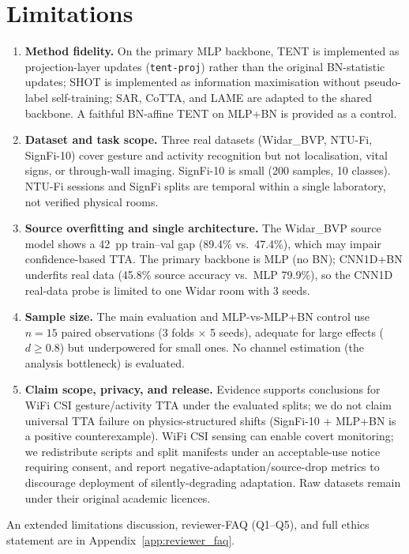 \section{Limitations}

\begin{enumerate}
    \item \textbf{Method fidelity.} On the primary MLP backbone, TENT is implemented as projection-layer updates (\texttt{tent-proj}) rather than the original BN-statistic updates; SHOT is implemented as information maximisation without pseudo-label self-training; SAR, CoTTA, and LAME are adapted to the shared backbone. A faithful BN-affine TENT on MLP+BN is provided as a control.
    \item \textbf{Dataset and task scope.} Three real datasets (Widar\_BVP, NTU-Fi, SignFi-10) cover gesture and activity recognition but not localisation, vital signs, or through-wall imaging. SignFi-10 is small (200 samples, 10 classes). NTU-Fi sessions and SignFi splits are temporal within a single laboratory, not verified physical rooms.
    \item \textbf{Source overfitting and single architecture.} The Widar\_BVP source model shows a 42~pp train--val gap (89.4\% vs.\ 47.4\%), which may impair confidence-based TTA. The primary backbone is MLP (no BN); CNN1D+BN underfits real data (45.8\% source accuracy vs.\ MLP 79.9\%), so the CNN1D real-data probe is limited to one Widar room with 3 seeds.
    \item \textbf{Sample size.} The main evaluation and MLP-vs-MLP+BN control use $n{=}15$ paired observations (3 folds $\times$ 5 seeds), adequate for large effects ($d{\geq}0.8$) but underpowered for small ones. No channel estimation (the analysis bottleneck) is evaluated.
    \item \textbf{Claim scope, privacy, and release.} Evidence supports conclusions for WiFi CSI gesture/activity TTA under the evaluated splits; we do not claim universal TTA failure on physics-structured shifts (SignFi-10 + MLP+BN is a positive counterexample). WiFi CSI sensing can enable covert monitoring; we redistribute scripts and split manifests under an acceptable-use notice requiring consent, and report negative-adaptation/source-drop metrics to discourage deployment of silently-degrading adaptation. Raw datasets remain under their original academic licences.
\end{enumerate}

An extended limitations discussion, reviewer-FAQ (Q1--Q5), and full ethics statement are in Appendix~\ref{app:reviewer_faq}.
